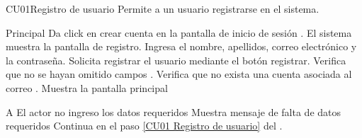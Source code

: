 
% 



	\begin{UseCase}{CU01}{Registro de usuario}{
		Permite a un usuario registrarse en el sistema.
	}
	\end{UseCase}
	\begin{UCtrayectoria}{Principal}
		\UCpaso[\UCactor] Da click en crear cuenta en la pantalla de inicio de sesión  .
        \UCpaso El sistema muestra la pantalla de registro.
		\UCpaso[\UCactor] Ingresa el nombre, apellidos, correo electrónico y la contraseña.
      \UCpaso[\UCactor]   Solicita registrar el usuario mediante el botón registrar.
		\UCpaso Verifica que no se hayan omitido campos  .
       \UCpaso  Verifica que no exista una cuenta asociada al correo 	.
       \UCpaso Muestra la pantalla principal
	\end{UCtrayectoria}

		\begin{UCtrayectoriaA}{A}{ El actor no ingreso los datos requeridos}
			\UCpaso Muestra mensaje de falta de datos requeridos
			\UCpaso Continua en el paso \ref{CU01 Registro de usuario} del .
		\end{UCtrayectoriaA}
        
